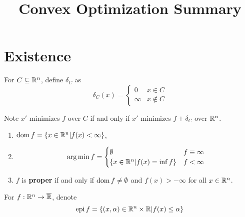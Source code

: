 

\title{Convex Optimization Summary}



\maketitle

\section{Existence}
\label{sec:existence}

\begin{defn}
  \label{sec:existence-1}
  For $C \subseteq \mathbb{R}^{n}$, define $\delta_{C}$ as
  \begin{equation}
    \label{eq:1} \delta_{C}(x) = 
    \begin{cases}
      0 & x \in C \\
      \infty & x \notin C
    \end{cases}
  \end{equation}

  Note $x'$ minimizes $f$ over $C$ if and only if $x'$ minimizes $f +
  \delta_{C}$ over $\mathbb{R}^{n}$.
\end{defn}

\begin{defn}
  \label{sec:existence-2}
  \begin{enumerate}
  \item $\operatorname*{dom} f = \{ x \in \mathbb{R}^{n} | f(x) < \infty \}$,
  \item \begin{equation}
      \operatorname*{arg\,min} f =
      \begin{cases}
        \emptyset & f \equiv \infty \\
        \{ x \in \mathbb{R}^{n} | f(x) = \inf f \} & f < \infty 
      \end{cases}
    \end{equation}
  \item $f$ is \textbf{proper} if and only if $\operatorname*{dom} f \neq \emptyset$
    and $f(x) > -\infty$ for all $x \in \mathbb{R}^{n}$.
  \end{enumerate}
\end{defn}

\begin{defn}
  \label{sec:existence-3}
  For $f: \mathbb{R}^{n} \rightarrow \overline {\mathbb{R}}$, denote
  \begin{equation}
    \label{eq:2}
    \operatorname*{epi} f = \{ (x, \alpha) \in \mathbb{R}^{n} \times \mathbb{R} | f(x) \leq \alpha \} 
  \end{equation}
\end{defn}

